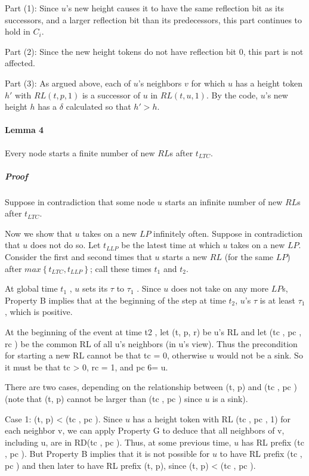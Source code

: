Part (1): Since $u$'s new height causes it to have the same reflection bit as its successors, and a larger reflection bit than its predecessors, this part continues to hold in $C_i$.

Part (2): Since the new height tokens do not have reflection bit $0$, this part is not affected.

Part (3): As argued above, each of $u$'s neighbors $v$ for which $u$ has a height token $h'$ with $RL (t, p, 1)$ is a successor of $u$ in $RL (t, u, 1)$. By the code, $u$'s new height $h$ has a $\delta$ calculated so that $h' > h$.
\paragraph{Lemma 4} Every node starts a finite number of new $RL$s after $t_{LTC}$.

\subparagraph{Proof} Suppose in contradiction that some node $u$ starts an infinite number of new $RL$s after $t_{LTC}$.

Now we show that $u$ takes on a new $LP$ infinitely often. Suppose in contradiction that $u$ does not do so. Let $t_{LLP}$ be the latest time at which $u$ takes on a new $LP$. Consider the first and second times that $u$ starts a new $RL$ (for the same $LP$) after $max\left\lbrace t_{LTC}, t_{LLP} \right\rbrace $; call these times $t_1$ and $t_2$.

At global time $t_1$ , $u$ sets its $\tau$ to $\tau _1$ . Since $u$ does not take on any more $LP$s, Property B implies that at the beginning of the step at time $t_2$, $u$’s $\tau$ is at least $\tau _1$ , which is positive.

At the beginning of the event at time t2 , let (t, p, r) be u’s RL and let (tc , pc , rc ) be the common RL of all u’s neighbors (in u’s view). Thus the precondition for starting a new RL cannot be that tc = 0, otherwise $u$ would not be a sink. So it must be that tc > 0, rc = 1, and pc 6= u.

There are two cases, depending on the relationship between (t, p) and (tc , pc ) (note that (t, p) cannot be larger than (tc , pc ) since $u$ is a sink).

Case 1: (t, p) < (tc , pc ). Since $u$ has a height token with RL (tc , pc , 1) for each neighbor v, we can apply Property G to deduce that all neighbors of v, including u, are in RD(tc , pc ). Thus, at some previous time, $u$ has RL prefix (tc , pc ). But Property B implies that it is not possible for $u$ to have RL prefix (tc , pc ) and then later to have RL prefix (t, p), since (t, p) < (tc , pc ).

